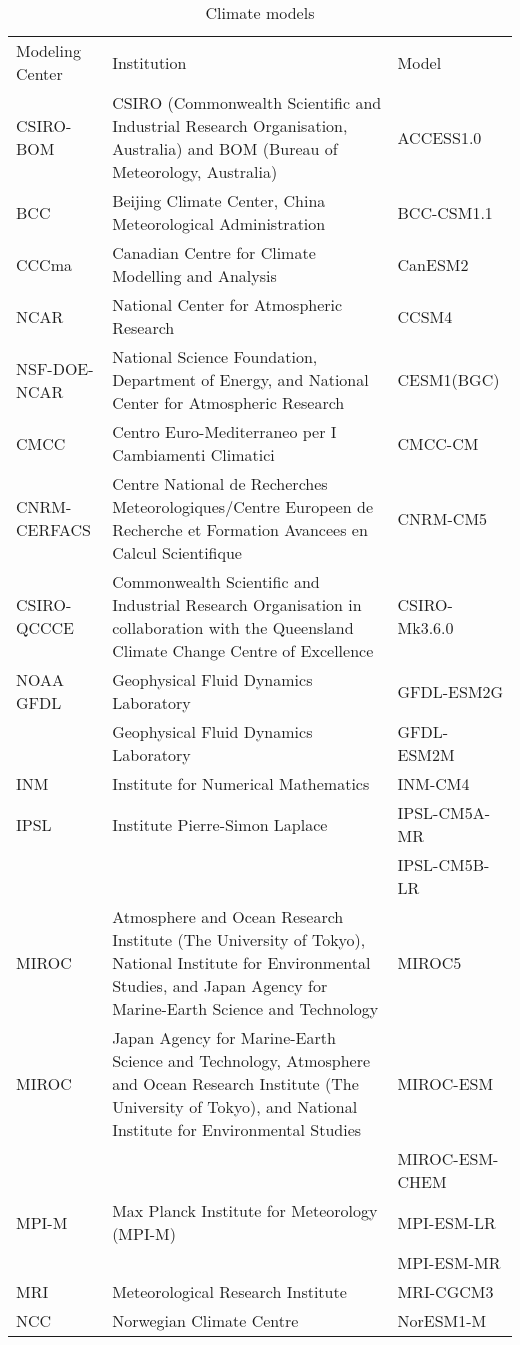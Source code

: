 \documentclass[12pt]{article}
\begin{document}
\begin{table}[H]
  \caption{Climate models}
  \centering
  \fontsize{9}{12}\selectfont
  \begin{tabular}{lp{8cm}l}
    \toprule
Modeling Center& Institution &Model\\
CSIRO-BOM &CSIRO (Commonwealth Scientific and Industrial Research Organisation,
Australia) and BOM (Bureau of Meteorology, Australia) & ACCESS1.0 \\
BCC& Beijing Climate Center, China Meteorological Administration & BCC-CSM1.1 \\
CCCma & Canadian Centre for Climate Modelling and Analysis & CanESM2 \\
NCAR & National Center for Atmospheric Research &CCSM4 \\
NSF-DOE-NCAR & National Science Foundation, Department of Energy, and National Center for Atmospheric Research &CESM1(BGC)\\
CMCC & Centro Euro-Mediterraneo per I Cambiamenti Climatici & CMCC-CM\\
CNRM-CERFACS & Centre National de Recherches Meteorologiques/Centre Europeen de
Recherche et Formation Avancees en Calcul Scientifique & CNRM-CM5\\
CSIRO-QCCCE & Commonwealth Scientific and Industrial Research Organisation in
collaboration with the Queensland Climate Change Centre of Excellence & CSIRO-Mk3.6.0 \\
NOAA GFDL & Geophysical Fluid Dynamics Laboratory & GFDL-ESM2G \\
          & Geophysical Fluid Dynamics Laboratory & GFDL-ESM2M \\
INM & Institute for Numerical Mathematics & INM-CM4 \\
IPSL & Institute Pierre-Simon Laplace & IPSL-CM5A-MR \\
&& IPSL-CM5B-LR \\
MIROC & Atmosphere and Ocean Research Institute (The University of Tokyo),
National Institute for Environmental Studies, and Japan Agency for Marine-Earth
Science and Technology & MIROC5\\
MIROC & Japan Agency for Marine-Earth Science and Technology, Atmosphere and
Ocean Research Institute (The University of Tokyo), and National Institute for
Environmental Studies & MIROC-ESM \\
&&MIROC-ESM-CHEM\\ 
MPI-M & Max Planck Institute for Meteorology (MPI-M) & MPI-ESM-LR\\ 
&&MPI-ESM-MR\\ 
MRI & Meteorological Research Institute & MRI-CGCM3\\
NCC & Norwegian Climate Centre & NorESM1-M \\
    \bottomrule
  \end{tabular}
  \label{tab:climate_models}
\end{table}
\newpage


\end{document}
